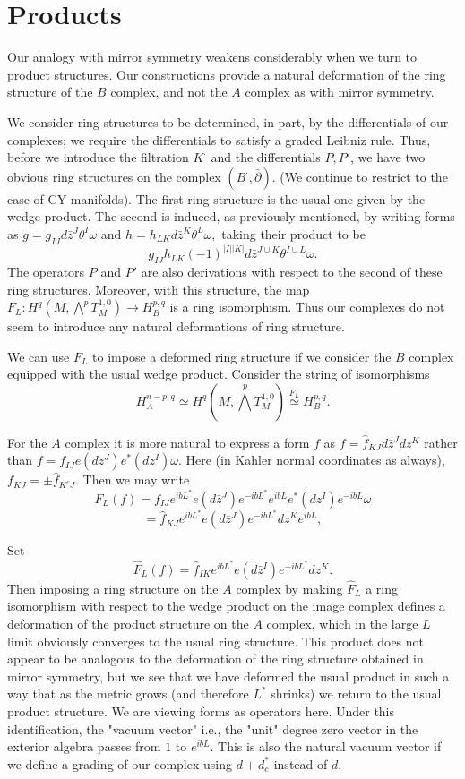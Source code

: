 \documentclass[a4paper,11pt]{amsart}
\newcommand{\db}{\bar{\partial}}
\begin{document}
\section{Products}

 Our analogy with mirror symmetry weakens considerably when we turn to product
  structures. Our constructions 
 provide a natural deformation of the ring structure of the $B$ complex, and not the $A$ complex as with
  mirror symmetry. 
  
We consider ring structures to be determined, in part, by the differentials of
 our complexes; we require the differentials to satisfy a graded Leibniz rule. 
 Thus, before we introduce the filtration $K^{\cdot}$ and the differentials 
 $P,P'$, we have two obvious ring structures on the
  complex $(B^{\cdot},\db)$. (We continue to restrict to the case of CY 
  manifolds). The first ring structure 
is the usual one given by the wedge product. The second is induced, as
 previously mentioned, by writing forms as 
 $g = g_{IJ}d\bar z^J\theta^I\omega$ and $h = h_{LK}d\bar z^K\theta^L\omega,$ 
 taking their product to be 
 $$g_{IJ}h_{LK}(-1)^{|I||K|}d\bar z^{J\cup K}\theta^{I\cup L}\omega.$$
 The operators $P$ and $P'$ are also derivations with respect to the second of
  these ring structures. Moreover, with this structure, 
the map $F_L:H^q(M,\bigwedge^p T_M^{1,0})\rightarrow H^{p,q}_B$ is a ring
isomorphism. Thus our complexes do not seem to introduce any natural
 deformations of ring structure.

 
 
  We can use $F_L$ to impose a deformed ring structure if we consider the $B$
 complex equipped with the usual wedge product. Consider the string of
  isomorphisms 
  $$H_A^{n-p,q}\simeq H^q(M,\bigwedge^pT_M^{1,0})\stackrel{F_L}{\simeq}
  H_B^{p,q}.$$
  
  For the $A$ complex it is more natural to express 
  a form $f$ as  $f = \hat f_{KJ}d\bar z^Jdz^K$ rather than 
  $f = f_{IJ}e(d\bar z^J)e^*(dz^I)\omega$. Here (in Kahler normal
  coordinates as always), $f_{KJ} = \pm \hat f_{K^cJ}.$ Then we may write 
$$F_L(f) =
f_{IJ}e^{ibL^*}e(d\bar{z}^J)e^{-ibL^*}e^{ibL}e^*(dz^I)e^{-ibL}\omega$$
$$ =
\hat f_{KJ}e^{ibL^*}e(d\bar{z}^J)e^{-ibL^*}dz^Ke^{ibL},$$ 

Set 
$$\hat F_L(f) = \hat f_{IK}e^{ibL^*}e(d\bar{z}^I)e^{-ibL^*}dz^K.$$
Then imposing a ring structure on the $A$ complex by making 
$\hat F_L$ a ring isomorphism with respect to the wedge product on the image
complex defines a deformation of the product structure on the $A$ complex, which 
in the large $L$ limit obviously converges to the usual ring structure. This product does not appear to be
analogous to the deformation of the ring structure obtained in mirror symmetry, 
but we see that we have deformed
the usual product in such a way that as the metric grows (and 
therefore $L^*$ shrinks) we return to the usual product structure. We are 
viewing forms as operators here. Under this identification, the "vacuum vector" 
i.e., the "unit" degree zero vector in the exterior algebra passes from 
$1$ to $e^{ibL}$. This is also the natural vacuum vector if we 
define a grading of our complex using $d+d_c^*$ instead of $d$. 
\end{document}
